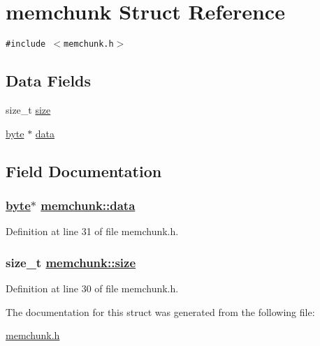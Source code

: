 \hypertarget{structmemchunk}{
\section{memchunk Struct Reference}
\label{structmemchunk}
}
{\tt \#include $<$memchunk.h$>$}

\subsection*{Data Fields}
\begin{CompactItemize}
\item 
size\_\-t \hyperlink{structmemchunk_o0}{size}
\item 
\hyperlink{beecrypt_8api_8h_a3}{byte} $\ast$ \hyperlink{structmemchunk_o1}{data}
\end{CompactItemize}


\subsection{Field Documentation}
\hypertarget{structmemchunk_o1}{
\subsubsection[data]{\setlength{\rightskip}{0pt plus 5cm}\hyperlink{beecrypt_8api_8h_a3}{byte}$\ast$ \hyperlink{structmemchunk_o1}{memchunk::data}}}
\label{structmemchunk_o1}


Definition at line 31 of file memchunk.h.\hypertarget{structmemchunk_o0}{
\subsubsection[size]{\setlength{\rightskip}{0pt plus 5cm}size\_\-t \hyperlink{structmemchunk_o0}{memchunk::size}}}
\label{structmemchunk_o0}


Definition at line 30 of file memchunk.h.

The documentation for this struct was generated from the following file:\begin{CompactItemize}
\item 
\hyperlink{memchunk_8h}{memchunk.h}\end{CompactItemize}
